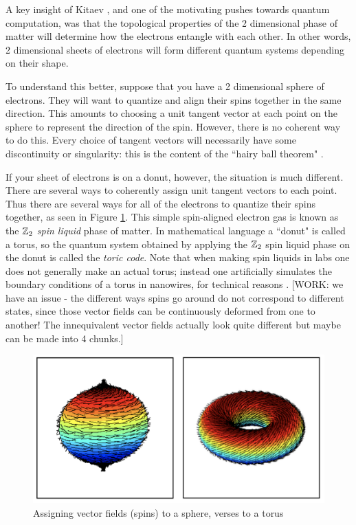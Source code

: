 \documentclass{article}
\theoremstyle{definition}
\numberwithin{figure}{section}
\begin{document}
A key insight of Kitaev \cite{kitaev2003fault}, and one of the motivating pushes towards quantum computation, was that the topological properties of the 2 dimensional phase of matter will determine how the electrons entangle with each other. In other words, 2 dimensional sheets of electrons will form different quantum systems depending on their shape.

To understand this better, suppose that you have a 2 dimensional sphere of electrons. They will want to quantize and align their spins together in the same direction. This amounts to choosing a unit tangent vector at each point on the sphere to represent the direction of the spin. However, there is no coherent way to do this. Every choice of tangent vectors will necessarily have some discontinuity or singularity: this is the content of the ``hairy ball theorem" \cite{eisenberg1979proof}.

If your sheet of electrons is on a donut, however, the situation is much different. There are several ways to coherently assign unit tangent vectors to each point. Thus there are several ways for all of the electrons to quantize their spins together, as seen in Figure \ref{fig:hairy-ball}. This simple spin-aligned electron gas is known as the $\mathbb{Z}_2$ \textit{spin liquid} phase of matter.  In mathematical language a ``donut" is called a torus, so the quantum system obtained by applying the $\mathbb{Z}_2$ spin liquid phase on the donut is called the \textit{toric code}. Note that when making spin liquids in labs one does not generally make an actual torus; instead one artificially simulates the boundary conditions of a torus in nanowires, for technical reasons \cite{albrecht2016exponential, mourik2012signatures}. [WORK: we have an issue - the different ways spins go around do not correspond to different states, since those vector fields can be continuously deformed from one to another! The innequivalent vector fields actually look quite different but maybe can be made into 4 chunks.]

\begin{figure}
\begin{center}
\includegraphics[scale=0.2]{Hairy-Ball-Diagram}
\caption{Assigning vector fields (spins) to a sphere, verses to a torus}
\label{fig:hairy-ball}
\end{center}
\end{figure}
\end{document}
